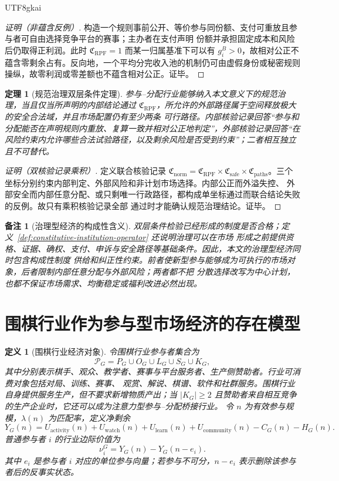 \documentclass[12pt,a4paper,openany]{report}
\newtheorem{definition}{定义}[chapter]
\newtheorem{theorem}{定理}[chapter]
\newtheorem{remark}{备注}[chapter]
\newcommand{\Part}{\mathcal P}
\begin{document}
\begin{CJK*}{UTF8}{gkai}
\begin{proof}[证明（非蕴含反例）]
构造一个规则事前公开、等价参与同份额、支付可重放且参与者可自由选择竞争平台的赛事；主办者在支付声明
份额并承担固定成本和风险后仍取得正利润。此时 \(\mathfrak C_{\mathrm{RPF}}=1\) 而某一归属基准下可以有
\(g_i^B>0\)，故相对公正不蕴含零剩余占有。反向地，一个平均分完收入池的机制仍可由虚假身份或秘密规则
操纵，故零利润或零差额也不蕴含相对公正。证毕。
\end{proof}

\begin{theorem}[规范治理双层条件定理]
\label{thm:dual-layer-governance}
参与--分配行业能够纳入本文意义下的规范治理，当且仅当所声明的内部结论通过
\(\mathfrak C_{\mathrm{RPF}}\)，所允许的外部路径属于空间释放极大的安全合法域，并且市场配置仍有至少两条
可行路径。内部核验记录回答“参与和分配能否在声明规则内重放、复算一致并相对公正地判定”，外部核验记录回答“在
风险约束内允许哪些合法试验路径，以及剩余风险是否受到约束”；二者相互独立且不可替代。
\end{theorem}

\begin{proof}[证明（双核验记录乘积）]
定义联合核验记录
\(\mathfrak C_{\mathrm{norm}}=\mathfrak C_{\mathrm{RPF}}\times\mathfrak C_{\mathrm{safe}}\times
\mathfrak C_{\mathrm{paths}}\)。三个坐标分别约束内部判定、外部风险和非计划市场选择。内部公正而外溢失控、
外部安全而内部任意分配、或只剩唯一行政路径，都构成单坐标通过而联合结论失败的反例。故只有乘积核验记录全部
通过时才能确认规范治理结论。证毕。
\end{proof}

\begin{remark}[治理型经济的构成性含义]
双层条件检验已经形成的制度是否合格；定义~\ref{def:constitutive-institution-operator} 还说明治理可以在市场
形成之前提供资格、证据、确权、支付、申诉与安全路径等基础条件。因此，本文的治理型经济同时包含构成性制度
供给和纠正性约束。前者使新型参与能够成为可执行的市场对象，后者限制内部任意分配与外部风险；两者都不把
分散选择改写为中心计划，也都不保证市场需求、均衡稳定或福利改进必然出现。
\end{remark}

\section{围棋行业作为参与型市场经济的存在模型}

\begin{definition}[围棋行业经济对象]
令围棋行业参与者集合为
\[
  \Part_G=P_G\cup O_G\cup L_G\cup S_G\cup K_G,
\]
其中分别表示棋手、观众、教学者、赛事与平台服务者、生产侧赞助者。行业可消费对象包括对局、训练、赛事、
观赏、解说、棋谱、软件和社群服务。围棋行业自身提供服务生产，但不要求新增物质产出；当
\(|K_G|\ge2\) 且赞助者来自相互竞争的生产企业时，它还可以成为注意力型参与--分配桥接行业。
令 \(n\) 为有效参与规模，\(\lambda(n)\) 为匹配率，定义净剩余
\[
  Y_G(n)
  =U_{\mathrm{activity}}(n)+U_{\mathrm{watch}}(n)
  +U_{\mathrm{learn}}(n)+U_{\mathrm{community}}(n)-C_G(n)-H_G(n).
\]
普通参与者 \(i\) 的行业边际价值为
\[
  \nu_i^G=Y_G(n)-Y_G(n-e_i).
\]
其中 \(e_i\) 是参与者 \(i\) 对应的单位参与向量；若参与不可分，\(n-e_i\) 表示删除该参与者后的反事实状态。
\end{definition}


\end{CJK*}
\end{document}
